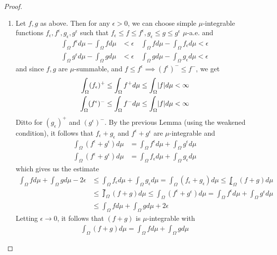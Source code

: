 \begin{proof}
  \begin{enumerate}
    \item 
  Let $f,g$ as above.
  Then for any $\epsilon > 0$, we can choose simple $\mu$-integrable functions $f_{\epsilon},f^{\epsilon},g_{\epsilon},g^{\epsilon}$ such that
  $f_{\epsilon} \leq f\leq f^{\epsilon}, g_{\epsilon} \leq g \leq g^{\epsilon}$ $\mu$-a.e.
  and
  \begin{align*}
    \int_{\Omega} f^{\epsilon} d \mu - \int_{\Omega} f d \mu &< \epsilon
    \quad
    \int_{\Omega} f d \mu - \int_{\Omega} f_{\epsilon} d \mu < \epsilon\\
    \int_{\Omega} g^{\epsilon} d \mu - \int_{\Omega} g d \mu &< \epsilon
    \quad
    \int_{\Omega} g d \mu - \int_{\Omega} g_{\epsilon} d \mu < \epsilon
  \end{align*}
  and since $f,g$ are $\mu$-summable, and $f \leq f^{\epsilon} \implies (f^{\epsilon})^{-} \leq f^{-}$, we get
  \begin{align*}
    \int_{\Omega} (f_{\epsilon})^{+} \leq \int_{\Omega} f^{+} d \mu \leq \int_{\Omega} \abs{f} d \mu < \infty\\
    \int_{\Omega} (f^{\epsilon})^{-} \leq \int_{\Omega} f^{-}d \mu \leq \int_{\Omega} \abs{f} d \mu < \infty
  \end{align*}
  Ditto for $(g_{\epsilon})^{+}$ and $(g^{\epsilon})^{-}$.
  By the previous Lemma (using the weakened condition), it follows that $f_{\epsilon}+g_{\epsilon}$ and $f^{\epsilon} + g^{\epsilon}$ are $\mu$-integrable and 
  \begin{align*}
    \int_{\Omega} (f^{\epsilon} + g^{\epsilon}) d \mu 
    &= 
    \int_{\Omega} f^{\epsilon} d \mu + \int_{\Omega} g^{\epsilon} d \mu\\
    \int_{\Omega} (f^{\epsilon} + g^{\epsilon}) d \mu 
    &= 
    \int_{\Omega} f_{\epsilon} d \mu + \int_{\Omega} g_{\epsilon} d \mu
  \end{align*}
  which gives us the estimate
  \begin{align*}
    \int_{\Omega} f d \mu + \int_{\Omega} g d \mu - 2 \epsilon 
    &\leq
    \int_{\Omega} f_{\epsilon} d \mu + \int_{\Omega} g_{\epsilon} d \mu
    =
    \int_{\Omega} (f_{\epsilon} + g_{\epsilon}) d \mu
    \leq 
    \lowint_{\Omega} (f + g) d \mu
    \\
    &\leq
    \upint_{\Omega} (f + g) d \mu
    \leq 
    \int_{\Omega} (f^{\epsilon} + g^{\epsilon}) d \mu
    =
    \int_{\Omega} f^{\epsilon} d \mu + \int_{\Omega} g^{\epsilon} d \mu
    \\
    &\leq
    \int_{\Omega} f d \mu + \int_{\Omega} g d \mu + 2 \epsilon
  \end{align*}
  Letting $\epsilon \to 0$, it follows that $(f + g)$ is $\mu$-integrable with
  \begin{align*}
    \int_{\Omega} (f + g) d \mu = \int_{\Omega} f d \mu + \int_{\Omega} g d \mu
  \end{align*}


\end{enumerate}
\end{proof}
